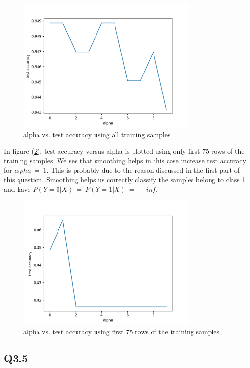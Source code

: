 \documentclass[12pt]{report}
\begin{document}
\begin{figure}[h!]
  \centering
  \includegraphics[width=0.8\textwidth]{q4_1}
  \caption{alpha vs. test accuracy using all training samples}
  \label{fig:q4_1}
\end{figure}

In figure (\ref{fig:q4_2}), test accuracy versus alpha is plotted using only first 75 rows of the training samples. We see that smoothing helps in this case increase test accuracy for $alpha~=~1$. This is probably due to the reason discussed in the first part of this question. Smoothing helps us correctly classify the samples belong to class 1 and have $P(Y=0|X)~=~P(Y=1|X)~=~-inf$.

\begin{figure}[h!]
  \centering
  \includegraphics[width=0.8\textwidth]{q4_2}
  \caption{alpha vs. test accuracy using first 75 rows of the training samples}
  \label{fig:q4_2}
\end{figure}

\subsection*{Q3.5}
\end{document}
